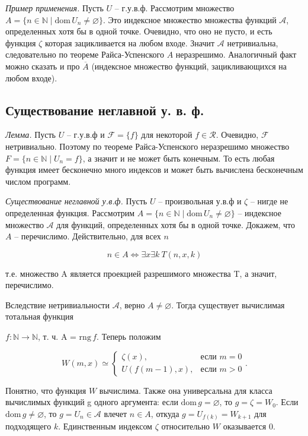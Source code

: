 \documentclass[a4paper, 10pt]{article}
\newcommand{\FF}{\mathcal{F}}
\newcommand{\RR}{\mathcal{R}}
\newcommand{\dom}{\text{dom}\,}
\newcommand{\rng}{\text{rng}\,}
\begin{document}
\textit{Пример применения.} Пусть $U$ -- г.у.в.ф. Рассмотрим множество $A=\{n\in\mathbb{N} \mid \dom U_n \ne \varnothing \}$. Это индексное множество множества функций $\mathcal{A}$, определенных хотя бы в одной точке. Очевидно, что оно не пусто, и есть функция $\zeta$ которая зацикливается на любом входе. Значит $\mathcal{A}$ нетривиальна, следовательно по теореме Райса-Успенского $A$ неразрешимо. Аналогичный факт можно сказать и про $\overline{A}$ (индексное множество функций, зацикливающихся на любом входе).

\subsection{Существование неглавной у. в. ф.}

\textit{Лемма.} Пусть $U$ -- г.у.в.ф и $\FF = \{f\}$ для некоторой $f \in \RR$. Очевидно, $\FF$ нетривиально. Поэтому по теореме Райса-Успенского неразрешимо множество $F = \{ n \in \mathbb{N} \mid U_n=f \}$, а значит и не может быть конечным. То есть любая функция имеет бесконечно много индексов и может быть вычислена бесконечным числом программ.

\hfill

\textit{Существование неглавной у.в.ф.} Пусть $U$ -- произвольная у.в.ф и $\zeta$ -- нигде не определенная функция. Рассмотрим $A=\{n\in\mathbb{N} \mid \dom U_n \ne \varnothing \}$ -- индексное множество $\mathcal{A}$ для функций, определенных хотя бы в одной точке. Докажем, что $A$ -- перечислимо. Действительно, для всех $n$

$$ n \in A \Leftrightarrow \exists x \exists k \: T(n, x, k) $$

т.е. множество A является проекцией разрешимого множества T, а значит, перечислимо.

Вследствие нетривиальности $\mathcal{A}$, верно $A \ne \varnothing$. Тогда существует вычислимая тотальная функция

$f: \mathbb{N} \to \mathbb{N}$, т. ч. A = $\rng f$. Теперь положим

$$ W(m, x) \simeq \begin{cases}
    \zeta(x), & \text{если } m = 0\\
    U(f(m - 1), x), & \text{если } m > 0
\end{cases}. $$

Понятно, что функция $W$ вычислима. Также она универсальна для класса вычислимых функций g одного
аргумента: если $\dom g = \varnothing$, то $g = \zeta = W_0$. Если $\dom g \ne \varnothing$, то $g=U_n\in \mathcal{A}$ влечет $n \in A$, откуда $g=U_{f(k)} = W_{k + 1}$ для подходящего $k$. Единственным индексом $\zeta$ относительно $W$ оказывается $0$. 
\end{document}
